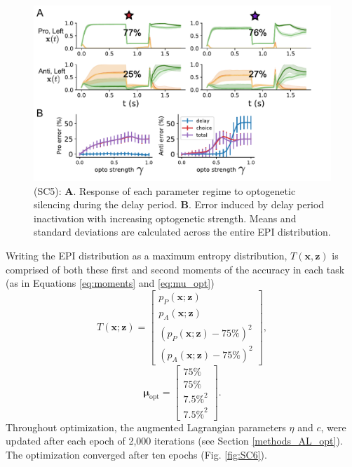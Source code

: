 \documentclass[11pt]{article}
\begin{document}
\begin{figure}
\begin{center}
\includegraphics[scale=0.8]{figures/figSC5/figSC5.pdf}
\end{center}
\caption{\small (SC5): 
\textbf{A}. Response of each parameter regime to optogenetic silencing during the delay period.
\textbf{B}. Error induced by delay period inactivation with increasing optogenetic strength.  Means and standard deviations are calculated across the entire EPI distribution.
}
\label{fig:SC5}
\end{figure}

Writing the EPI distribution as a maximum entropy distribution, $T(\mathbf{x}, \mathbf{z})$ is comprised of both these first and second moments of the accuracy in each task (as in Equations \ref{eq:moments} and \ref{eq:mu_opt})
\begin{equation} 
T(\mathbf{x}; \mathbf{z}) = \begin{bmatrix} p_P(\mathbf{x}; \mathbf{z}) \\ p_A(\mathbf{x}; \mathbf{z}) \\ \left(p_P(\mathbf{x}; \mathbf{z}) - 75\% \right)^2 \\ \left(p_A(\mathbf{x}; \mathbf{z}) - 75\% \right)^2 \end{bmatrix},
\end{equation}
\begin{equation} 
\bm{\mu}_{\text{opt}} = \begin{bmatrix} 75\% \\ 75\% \\ 7.5\%^2 \\ 7.5\%^2 \end{bmatrix}.
\end{equation}
Throughout optimization, the augmented Lagrangian parameters $\eta$ and $c$, were updated after each epoch of 2,000 iterations (see Section \ref{methods_AL_opt}).  
The optimization converged after ten epochs (Fig. \ref{fig:SC6}).
\end{document}
